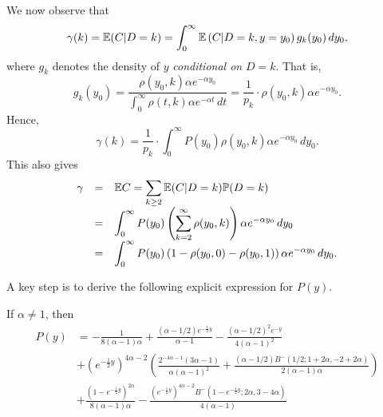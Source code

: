We now observe that 
\[
	\gamma(k) = {\mathbb E}( C | D=k ) = \int_0^\infty {\mathbb E}\left( C | D=k, y=y_0 \right) g_k(y_0) \, d y_0,
\]
where $g_k$ denotes the density of $y$ {\em conditional on} $D=k$. That is,
\[
	g_k(y_0)  = \frac{\rho(y_0, k) \alpha e^{-\alpha y_0} }{\int_0^\infty \rho(t, k) \alpha e^{-\alpha t} \, d t}
	= \frac{1}{p_k} \cdot \rho(y_0, k) \alpha e^{-\alpha y_0}.
\]
Hence, 
\begin{equation}\label{eq:gammakint}
\gamma(k) 
= \frac{1}{p_k} \cdot \int_0^\infty P(y_0) \rho(y_0,k) \alpha e^{-\alpha y_0} \, d y_0. 
\end{equation}
This also gives
\begin{equation}\label{eq:gammaint}
\begin{array}{rcl} 
\gamma 
& = & \displaystyle {\mathbb E} C = \sum_{k\geq 2} {\mathbb E}( C | D=k )\mathbb{P}( D=k ) \\
& = & \displaystyle \int_0^\infty P(y_0) \left( \sum_{k=2}^\infty \rho(y_0,k) \right) \alpha e^{-\alpha y_0} \, d y_0 \\
& = & \displaystyle \int_0^\infty P(y_0) \left(1 - \rho(y_0,0)-\rho(y_0,1)\right) \alpha e^{-\alpha y_0} \, d y_0.
\end{array}
\end{equation}


A key step is to derive the following explicit expression for $P(y)$.

\begin{lemma}\label{lem:Paneq1}
	If $\alpha \not = 1$, then
	\begin{align*}
	 P(y) &=-\frac{1}{8 (\alpha - 1) \alpha} + \frac{(\alpha - 1/2) e^{-\frac{1}{2}y}}{\alpha - 1} - \frac{(\alpha - 1/2)^2 e^{-y}}{
		4 (\alpha - 1)^2} \\
	&+ 
	(e^{-\frac{1}{2}y})^{4\alpha -2} \left(\frac{2^{-4 \alpha-1} (3 \alpha - 1)}{\alpha (\alpha - 1)^2} + \frac{(\alpha - 
		1/2 ) B^-(1/2; 1 + 2 \alpha, 
		-2 + 2 \alpha)}{2(\alpha - 1) \alpha} \right) \\
	&+ \frac{(1 - 
		e^{-\frac{1}{2}y})^{2 \alpha}}{8 (\alpha - 1) \alpha} - \frac{  
		(e^{-\frac{1}{2}y})^{4 \alpha - 2} B^-(1 - e^{-\frac{1}{2}y}; 2 \alpha, 3 - 4 \alpha)}{4 (\alpha - 1)}
	\end{align*}
\end{lemma}


